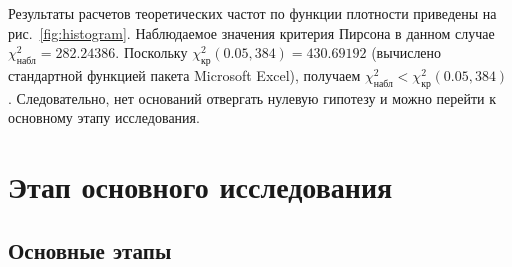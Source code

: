 \documentclass[a4paper,fontsize=14pt]{article}
\begin{document}
Результаты расчетов теоретических частот по функции плотности приведены на рис.~\ref{fig:histogram}. Наблюдаемое значения критерия Пирсона в данном случае $\chi_{\text{набл}}^2 = 282.24386$. Поскольку $\chi_{\text{кр}}^2(0.05, 384) = 430.69192$ (вычислено стандартной функцией пакета Microsoft Excel), получаем $\chi_{\text{набл}}^2 < \chi_{\text{кр}}^2(0.05, 384)$. Следовательно, нет оснований отвергать нулевую гипотезу и можно перейти к основному этапу исследования.

\section{Этап основного исследования} \label{sec:analysis_part_2}

\subsection{Основные этапы} \label{subsec:analysis_part_2_intro}
\end{document}
